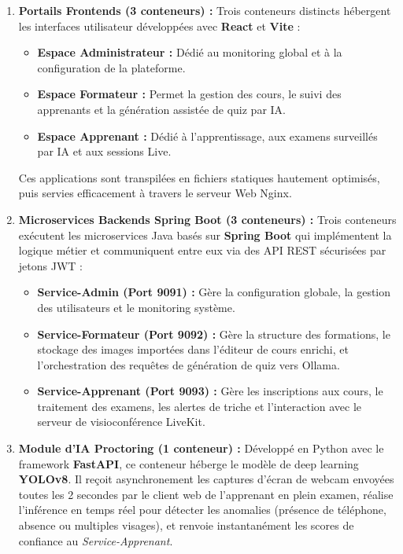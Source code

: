 \begin{enumerate}
    \item \textbf{Portails Frontends (3 conteneurs) :} 
    Trois conteneurs distincts hébergent les interfaces utilisateur développées avec \textbf{React} et \textbf{Vite} :
    \begin{itemize}
        \item \textbf{Espace Administrateur :} Dédié au monitoring global et à la configuration de la plateforme.
        \item \textbf{Espace Formateur :} Permet la gestion des cours, le suivi des apprenants et la génération assistée de quiz par IA.
        \item \textbf{Espace Apprenant :} Dédié à l'apprentissage, aux examens surveillés par IA et aux sessions Live.
    \end{itemize}
    Ces applications sont transpilées en fichiers statiques hautement optimisés, puis servies efficacement à travers le serveur Web Nginx.
    
    \item \textbf{Microservices Backends Spring Boot (3 conteneurs) :} 
    Trois conteneurs exécutent les microservices Java basés sur \textbf{Spring Boot} qui implémentent la logique métier et communiquent entre eux via des API REST sécurisées par jetons JWT :
    \begin{itemize}
        \item \textbf{Service-Admin (Port 9091) :} Gère la configuration globale, la gestion des utilisateurs et le monitoring système.
        \item \textbf{Service-Formateur (Port 9092) :} Gère la structure des formations, le stockage des images importées dans l'éditeur de cours enrichi, et l'orchestration des requêtes de génération de quiz vers Ollama.
        \item \textbf{Service-Apprenant (Port 9093) :} Gère les inscriptions aux cours, le traitement des examens, les alertes de triche et l'interaction avec le serveur de visioconférence LiveKit.
    \end{itemize}
    
    \item \textbf{Module d'IA Proctoring (1 conteneur) :} 
    Développé en Python avec le framework \textbf{FastAPI}, ce conteneur héberge le modèle de deep learning \textbf{YOLOv8}. Il reçoit asynchronement les captures d'écran de webcam envoyées toutes les 2 secondes par le client web de l'apprenant en plein examen, réalise l'inférence en temps réel pour détecter les anomalies (présence de téléphone, absence ou multiples visages), et renvoie instantanément les scores de confiance au \textit{Service-Apprenant}.
    

\end{enumerate}
